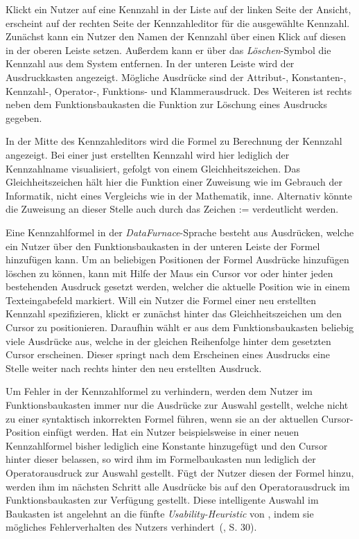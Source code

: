 \documentclass[
  language=german, %
  type=bachelor,%
  ngerman
]{isthesis}
\begin{document}
\begin{content}
  Klickt ein Nutzer auf eine Kennzahl in der Liste auf der linken Seite der
  Ansicht, erscheint auf der rechten Seite der Kennzahleditor für die
  ausgewählte Kennzahl. Zunächst kann ein Nutzer den Namen der Kennzahl über
  einen Klick auf diesen in der oberen Leiste setzen. Außerdem kann er über das
  \textit{Löschen}-Symbol die Kennzahl aus dem System entfernen. In der unteren
  Leiste wird der Ausdruckkasten angezeigt. Mögliche Ausdrücke sind der
  \mbox{Attribut-,} \mbox{Konstanten-,} \mbox{Kennzahl-,} \mbox{Operator-,}
  Funktions- und Klammerausdruck.  Des Weiteren ist rechts neben dem
  Funktionsbaukasten die Funktion zur Löschung eines Ausdrucks gegeben.

  In der Mitte des Kennzahleditors wird die Formel zu Berechnung der Kennzahl
  angezeigt. Bei einer just erstellten Kennzahl wird hier lediglich der
  Kennzahlname visualisiert, gefolgt von einem Gleichheitszeichen. Das
  Gleichheitszeichen hält hier die Funktion einer Zuweisung wie im Gebrauch
  der Informatik, nicht eines Vergleichs wie in der Mathematik, inne.
  Alternativ könnte die Zuweisung an dieser Stelle auch durch das Zeichen
  \mbox{:=} verdeutlicht werden. 
  
  Eine Kennzahlformel in der \textit{DataFurnace}-Sprache besteht aus
  Ausdrücken, welche ein Nutzer über den Funktionsbaukasten in der unteren
  Leiste der Formel hinzufügen kann. Um an beliebigen Positionen der Formel
  Ausdrücke hinzufügen \bzw{} löschen zu können, kann mit Hilfe der Maus ein
  Cursor vor oder hinter jeden bestehenden Ausdruck gesetzt werden, welcher die
  aktuelle Position wie in einem Texteingabefeld markiert. Will ein Nutzer die
  Formel einer neu erstellten Kennzahl spezifizieren, klickt er zunächst hinter
  das Gleichheitszeichen um den Cursor zu positionieren.  Daraufhin wählt er
  aus dem Funktionsbaukasten beliebig viele Ausdrücke aus, welche in der
  gleichen Reihenfolge hinter dem gesetzten Cursor erscheinen.  Dieser springt
  nach dem Erscheinen eines Ausdrucks eine Stelle weiter nach rechts hinter den
  neu erstellten Ausdruck. 

  Um Fehler in der Kennzahlformel zu verhindern, werden dem Nutzer im
  Funktionsbaukasten immer nur die Ausdrücke zur Auswahl gestellt, welche nicht
  zu einer syntaktisch inkorrekten Formel führen, wenn sie an der aktuellen
  Cursor-Position einfügt werden. Hat ein Nutzer beispielsweise in einer neuen
  Kennzahlformel bisher lediglich eine Konstante hinzugefügt und den Cursor
  hinter dieser belassen, so wird ihm im Formelbaukasten nun lediglich der
  Operatorausdruck zur Auswahl gestellt. Fügt der Nutzer diesen der Formel
  hinzu, werden ihm im nächsten Schritt alle Ausdrücke bis auf den
  Operatorausdruck im Funktionsbaukasten zur Verfügung gestellt. Diese
  intelligente Auswahl im Baukasten ist angelehnt an die fünfte
  \textit{Usability-Heuristic} von \textsc{\citeauthor{nielsen1994heuristic}},
  indem sie mögliches Fehlerverhalten des Nutzers
  verhindert~(\citeyear{nielsen1994heuristic}, S. 30).


\end{content}
\end{document}
